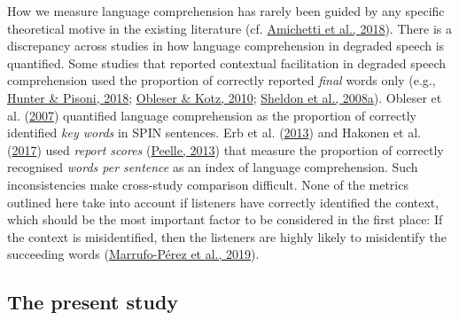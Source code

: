 \documentclass[a4paper, nobind]{templates/ociamthesis}
\begin{document}
How we measure language comprehension has rarely been guided by any specific theoretical motive in the existing literature (cf. \protect\hyperlink{ref-Amichetti2018}{Amichetti et al., 2018}).
There is a discrepancy across studies in how language comprehension in degraded speech is quantified.
Some studies that reported contextual facilitation in degraded speech comprehension used the proportion of correctly reported \emph{final} words only (e.g., \protect\hyperlink{ref-Hunter2018}{Hunter \& Pisoni, 2018}; \protect\hyperlink{ref-Obleser2010}{Obleser \& Kotz, 2010}; \protect\hyperlink{ref-Sheldon2008a}{Sheldon et al., 2008a}).
Obleser et al. (\protect\hyperlink{ref-Obleser2007}{2007}) quantified language comprehension as the proportion of correctly identified \emph{key words} in SPIN sentences.
Erb et al. (\protect\hyperlink{ref-Erb2013}{2013}) and Hakonen et al. (\protect\hyperlink{ref-Hakonen2017}{2017}) used \emph{report scores} (\protect\hyperlink{ref-Peelle2013}{Peelle, 2013}) that measure the proportion of correctly recognised \emph{words per sentence} as an index of language comprehension.
Such inconsistencies make cross-study comparison difficult.
None of the metrics outlined here take into account if listeners have correctly identified the context, which should be the most important factor to be considered in the first place:
If the context is misidentified, then the listeners are highly likely to misidentify the succeeding words (\protect\hyperlink{ref-Marrufo2019}{Marrufo-Pérez et al., 2019}).

\hypertarget{the-present-study}{%
\subsection{The present study}\label{the-present-study}}
\end{document}
